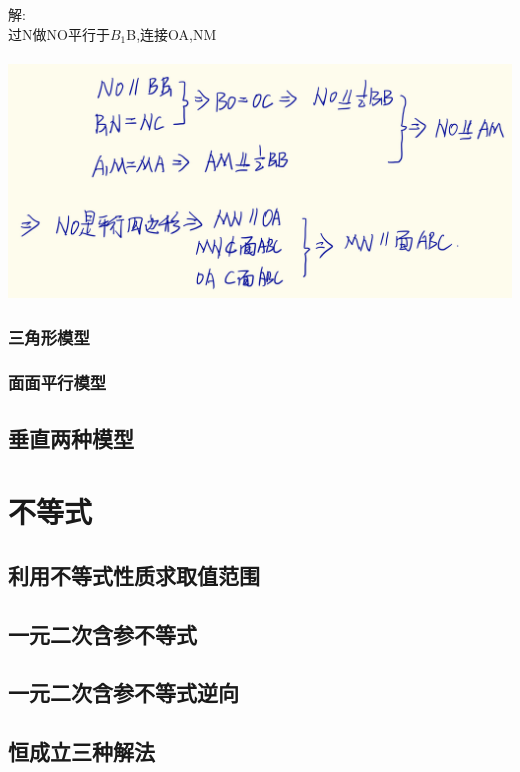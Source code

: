 \documentclass[hyperref, UTF8,11pt,a4paper]{ctexart} %
\begin{document}
解: \\
过N做NO平行于$B_{1}$B,连接OA,NM \\ \\
\includegraphics[width=400pt]  {pic/litijihe/pxsbxdaan2.jpg} \\

\subsubsection{三角形模型}
\subsubsection{面面平行模型}

\subsection{垂直两种模型}

\newpage

\section{不等式}
\subsection{利用不等式性质求取值范围}
\subsection{一元二次含参不等式}
\subsection{一元二次含参不等式逆向}
\subsection{恒成立三种解法}
\end{document}
